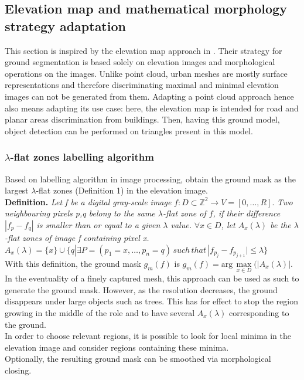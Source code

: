 \documentclass{kththesis}
\begin{document}
\subsection{Elevation map and mathematical morphology strategy adaptation}
This section is inspired by the elevation map approach in \parencite{det_seg_class, HernandezArtefacts}. Their strategy for ground segmentation is based solely on elevation images and morphological operations on the images. Unlike point cloud, urban meshes are mostly surface representations and therefore discriminating maximal and minimal elevation images can not be generated from them. Adapting a point cloud approach hence also means adapting its use case: here, the elevation map is intended for road and planar areas discrimination from buildings. Then, having this ground model, object detection can be performed on triangles present in this model.  
\subsubsection{$\lambda$-flat zones labelling algorithm}
Based on \textcite{morphoMeyer} labelling algorithm in image processing, \parencite{HernandezArtefacts, det_seg_class} obtain the ground mask as the largest $\lambda$-flat zones (Definition 1) in the elevation image. \\

\textbf{Definition. } \textit{Let f be a digital gray-scale image } $f:D \subset \mathbb{Z}^2 \rightarrow V = [0, \dots, R] $. \textit{Two neighbouring pixels p,q belong to the
same $\lambda$-flat zone of $f$, if their difference
$|f_p - f_q|$ is smaller than or equal to a given $\lambda$ value.} \textit{$\forall x \in D$, let $A_x(\lambda)$ be the $\lambda$-flat zones of image f containing pixel x.} \\
$A_x(\lambda) = \{x\}\cup \{q| \exists P=(p_1=x, \dots, p_n=q) \, such \, that \, |f_{p_j}-f_{p_{j+1}}| \leq \lambda \}$\\

With this definition, the ground mask $g_m(f)$ is $g_m(f) = \text{arg} \, \max \limits_{x \in D}(|A_x(\lambda)|$. \\ 

In the eventuality of a finely captured mesh, this approach can be used as such to generate the ground mask. However, as the resolution decreases, the ground disappears under large objects such as trees. This has for effect to stop the region growing in the middle of the role and to have several $A_x(\lambda)$ corresponding to the ground. \\ 
In order to choose relevant regions, it is possible to look for local minima in the elevation image and  consider regions containing these minima. \\
Optionally, the resulting ground mask can be smoothed via morphological closing. 
\end{document}
